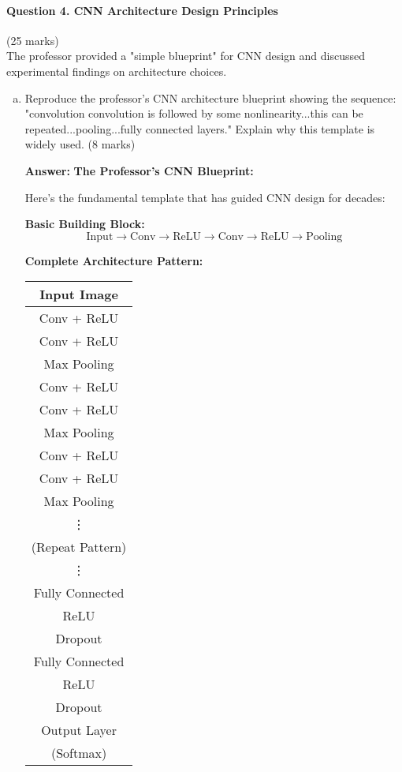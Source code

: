 \documentclass[12pt]{article}
\newcommand{\answer}[1]{{\color{answercolor}\textbf{Answer:} #1}}
\newcommand{\explanation}[1]{{\color{explanationcolor}#1}}
\begin{document}
\newpage
\paragraph{Question 4. CNN Architecture Design Principles}{\hfill (25 marks)}\\
The professor provided a "simple blueprint" for CNN design and discussed experimental findings on architecture choices.

\begin{enumerate}[(a)]
    \item Reproduce the professor's CNN architecture blueprint showing the sequence: "convolution convolution is followed by some nonlinearity...this can be repeated...pooling...fully connected layers." Explain why this template is widely used. \hfill (8 marks)
    
    \answer{
    \textbf{The Professor's CNN Blueprint:}
    
    \explanation{
    Here's the fundamental template that has guided CNN design for decades:
    
    \textbf{Basic Building Block:}
    \[
    \text{Input} \rightarrow \text{Conv} \rightarrow \text{ReLU} \rightarrow \text{Conv} \rightarrow \text{ReLU} \rightarrow \text{Pooling}
    \]
    
    \textbf{Complete Architecture Pattern:}
    \begin{center}
    \begin{tabular}{|c|}
    \hline
    \textbf{Input Image} \\
    \hline
    \hline
    Conv + ReLU \\
    Conv + ReLU \\
    Max Pooling \\
    \hline
    Conv + ReLU \\
    Conv + ReLU \\
    Max Pooling \\
    \hline
    Conv + ReLU \\
    Conv + ReLU \\
    Max Pooling \\
    \hline
    \vdots \\
    (Repeat Pattern) \\
    \vdots \\
    \hline
    Fully Connected \\
    ReLU \\
    Dropout \\
    \hline
    Fully Connected \\
    ReLU \\
    Dropout \\
    \hline
    Output Layer \\
    (Softmax) \\
    \hline
    \end{tabular}
    \end{center}
    }
    
}
\end{enumerate}
\end{document}
